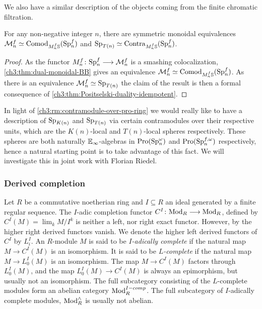 We also have a similar description of the objects coming from the finite chromatic filtration. 

\begin{proposition}
    For any non-negative integer $n$, there are symmetric monoidal equivalences $\mathcal{M}_{n}^f \simeq \mathrm{Comod}_{M^f_n\mathbb{S}}(\mathrm{Sp}^f_n)$ and $\mathrm{Sp}_{T(n)}\simeq \mathrm{Contra}_{M^f_n\mathbb{S}}(\mathrm{Sp}^f_n)$.
\end{proposition}
\begin{proof}
    As the functor $M_n^f\colon \mathrm{Sp}_n^f \longrightarrow \mathcal{M}_n^f$ is a smashing colocalization, \cref{ch3:thm:dual-monoidal-BB} gives an equivalence $\mathcal{M}_n^f \simeq \mathrm{Comod}_{M_n^f \mathbb{S}}(\mathrm{Sp}_n^f)$. As there is an equivalence $\mathcal{M}_n^f \simeq \mathrm{Sp}_{T(n)}$ the claim of the result is then a formal consequence of \cref{ch3:thm:Positselski-duality-idempotent}.
\end{proof}

\begin{remark}
    In light of \cref{ch3:rm:contramodule-over-pro-ring} we would really like to have a description of $\mathrm{Sp}_{K(n)}$ and $\mathrm{Sp}_{T(n)}$ via certain contramodules over their respective units, which are the $K(n)$-local and $T(n)$-local spheres respectively. These spheres are both naturally $\mathbb{E}_\infty$-algebras in $\operatorname{Pro}(\mathrm{Sp}_n^\omega)$ and $\operatorname{Pro}(\mathrm{Sp}_n^{f, \omega})$ respectively, hence a natural starting point is to take advantage of this fact. We will investigate this in joint work with Florian Riedel. 
\end{remark}

\subsubsection*{Derived completion}
\label{ch3:ssec:derived-completion}

Let $R$ be a commutative noetherian ring and $I\subseteq R$ an ideal generated by a finite regular sequence. The $I$-adic completion functor $C^I\colon \mathrm{Mod}_R \longrightarrow \mathrm{Mod}_R$, defined by $C^I(M)=\lim_k M/I^k$ is neither a left, nor right exact functor. However, by \cite[5.1]{greenlees-may_92} the higher right derived functors vanish. We denote the higher left derived functors of $C^I$ by $L^I_i$. An $R$-module $M$ is said to be \emph{$I$-adically complete} if the natural map $M\to C^I (M)$ is an isomorphism. It is said to be \emph{$L$-complete} if the natural map $M\to L_0^I(M)$ is an isomorphism. The map $M\to C^I(M)$ factors through $L_0^I(M)$, and the map $L_0^I(M)\to C^I(M)$ is always an epimorphism, but usually not an isomorphism. The full subcategory consisting of the $L$-complete modules form an abelian category $\mathrm{Mod}_R^{I-comp}$. The full subcategory of $I$-adically complete modules, $\mathrm{Mod}_R^\wedge$ is usually not abelian. 

